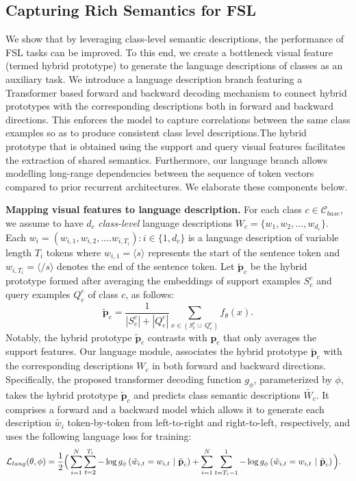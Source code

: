 \documentclass{bmvc2k}
\begin{document}
\subsection{Capturing Rich Semantics for FSL}
\label{subsection:RS_FSL}
We show that by leveraging class-level semantic descriptions, the performance of FSL tasks can be improved. To this end, we create a bottleneck visual feature (termed hybrid prototype) to generate the language descriptions of classes as an auxiliary task. We introduce a language description branch featuring a Transformer based forward and backward decoding mechanism to connect hybrid prototypes with the corresponding descriptions both in forward and backward directions. This enforces the model to capture correlations between the same class examples so as to produce consistent class level descriptions.The hybrid prototype that is obtained using the support and query visual features facilitates the extraction of shared semantics. Furthermore, our language branch allows modelling long-range dependencies between the sequence of token vectors compared to prior recurrent architectures. We elaborate these components below. 

\noindent \textbf{Mapping visual features to language description.}
For each class $c \in \mathcal{C}_{base}$, we assume to have $d_c$ \textit{class-level} language descriptions $W_{c}=\{w_1,w_2,...,w_{d_c}\}$. Each $w_i = (w_{i,1},w_{i,2},....w_{i,T_i}): i \in \{1, d_c\}$ is a language description of variable length $T_i$ tokens where $w_{i,1}=\langle s \rangle$ represents the start of the sentence token and $w_{i,T_i}=\langle /s \rangle$ denotes the end of the sentence token. Let $\tilde{\textbf{p}}_{c}$ be the hybrid prototype formed after averaging the embeddings of support  examples $S_{e}^{c}$ and query examples $Q_{e}^{c}$ of class $c$, as follows:
\vspace{-0.5em}
\begin{equation}
    \tilde{\textbf{p}}_{c}=\frac{1}{|S_{e}^{c}| + |Q_{e}^{c}|}\sum_{x\in (S_{e}^{c} \cup \ Q_{e}^{c} )} f_\theta (x). \label{Eq:new_proto}
\end{equation}
Notably, the hybrid prototype $\tilde{\textbf{p}}_{c}$ contrasts with $\textbf{p}_{c}$ that only averages the support features. Our language module, associates the hybrid prototype $\tilde{\textbf{p}}_{c}$ with the corresponding descriptions $W_{c}$ in both forward and backward directions. Specifically, the proposed transformer decoding function $g_\phi$, parameterized by $\phi$, takes the hybrid prototype $\tilde{\textbf{p}}_{c}$ and predicts class semantic descriptions $\tilde{W_{c}}$. It comprises a forward and a backward model which allows it to generate each description $\tilde{w_i}$ token-by-token from left-to-right and right-to-left, respectively, and uses the following language loss for training:
\begin{align}
\mathcal{L}_{lang}(\theta,\phi) & = \frac{1}{2} \Big(\sum_{i=1}^N \sum_{t=2}^{T_i} -\log g_\phi \left(\tilde{w}_{i,t} = w_{i,t} \ | \ \tilde{\textbf{p}}_{c}\right)  +  \sum_{i=1}^N \sum_{t=T_i-1}^{1} -\log g_\phi \left(\tilde{w}_{i,t} = w_{i,t} \ | \ \tilde{\textbf{p}}_{c} \right)\Big). \notag
\end{align}
\end{document}
